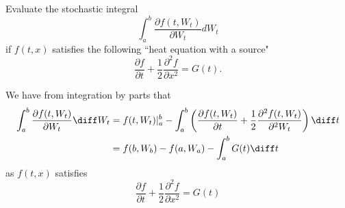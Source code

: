     \problem
    \begin{question}
        Evaluate the stochastic integral
        \[\int_a^b \frac{\partial f(t,W_t)}{\partial W_t}dW_t\]
        if $f(t,x)$ satisfies the following ``heat equation with a source"
        \[\frac{\partial f}{\partial t}+\frac{1}{2}\frac{\partial ^2f}{\partial x^2}=G(t).\]
    \end{question}
    We have from integration by parts that
    \[\begin{aligned}
        \int_a^b\frac{\partial f(t,W_t)}{\partial W_t}\diff W_t
        &=f(t,W_t)|_a^b
        -\int_a^b\left(\frac{\partial f(t,W_t)}{\partial t}
        +\frac{1}{2}\frac{\partial^2 f(t,W_t)}{\partial^2 W_t}\right)
        \diff t\\
        &=f(b,W_b)-f(a,W_a)-\int_a^bG(t)\diff t
    \end{aligned}\]
    as $f(t,x)$ satisfies
    \[\frac{\partial f}{\partial t}+\frac{1}{2}\frac{\partial^2 f}{\partial x^2}=G(t)\]

